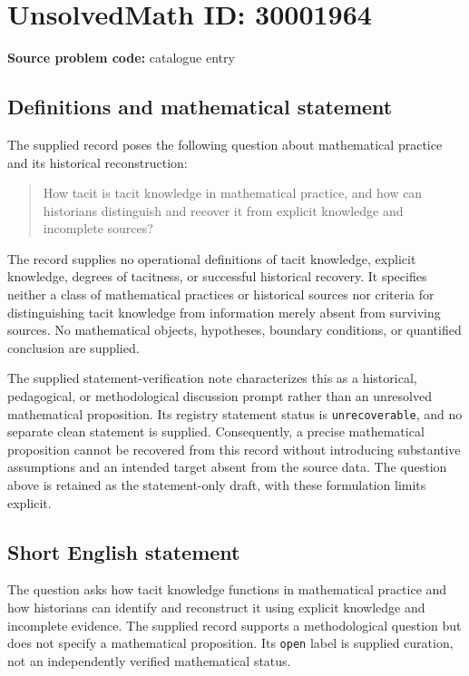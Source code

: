 \documentclass[11pt]{article}
\begin{document}
\section*{UnsolvedMath ID: 30001964}
\textbf{Source problem code:} catalogue entry
\subsection{Definitions and mathematical statement}
The supplied record poses the following question about mathematical practice and its historical reconstruction:
\begin{quote}
How tacit is tacit knowledge in mathematical practice, and how can historians distinguish and recover it from explicit knowledge and incomplete sources?
\end{quote}
The record supplies no operational definitions of tacit knowledge, explicit knowledge, degrees of tacitness, or successful historical recovery. It specifies neither a class of mathematical practices or historical sources nor criteria for distinguishing tacit knowledge from information merely absent from surviving sources. No mathematical objects, hypotheses, boundary conditions, or quantified conclusion are supplied.

The supplied statement-verification note characterizes this as a historical, pedagogical, or methodological discussion prompt rather than an unresolved mathematical proposition. Its registry statement status is \texttt{unrecoverable}, and no separate clean statement is supplied. Consequently, a precise mathematical proposition cannot be recovered from this record without introducing substantive assumptions and an intended target absent from the source data. The question above is retained as the statement-only draft, with these formulation limits explicit.
\subsection{Short English statement}
The question asks how tacit knowledge functions in mathematical practice and how historians can identify and reconstruct it using explicit knowledge and incomplete evidence. The supplied record supports a methodological question but does not specify a mathematical proposition. Its \texttt{open} label is supplied curation, not an independently verified mathematical status.
\end{document}
